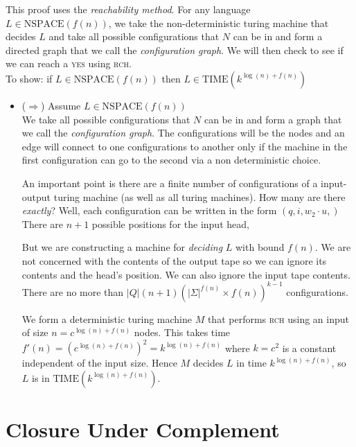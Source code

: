 This proof uses the \textit{reachability method}. For 
any language $L \in \text{NSPACE}(f(n))$, we take the non-deterministic 
turing machine that decides $L$ and take all possible configurations that
$N$ can be in and form a directed graph that we call the \textit{configuration graph}.
We will then check to see if we can reach a \textsc{yes} using \textsc{rch}.\\
To show: if $L \in \text{NSPACE}(f(n))$ then $L \in \text{TIME}(k^{\log(n)+f(n)})$

\begin{itemize}   
\renewcommand{\labelitemi}{$\Box$}
\item ($\Rightarrow$) Assume $L \in \text{NSPACE}(f(n))$ \\
We take all possible configurations that
$N$ can be in and form a graph that we call the \textit{configuration graph}.
The configurations will be the nodes and an edge will connect to 
one configurations to another only if the machine in the first configuration 
can go to the second via a non deterministic choice. 

An important point is there are a finite number of configurations 
of a input-output turing machine (as well as all turing machines). 
How many are there \textit{exactly}? Well, each configuration can 
be written in the form $(q, i, w_2\cdot u, )$
There are $n+1$ possible positions for the input head, 

But we are constructing a machine for \textit{deciding} $L$ with bound $f(n)$. 
We are not concerned with the contents of the output tape so we can ignore its 
contents and the head's position. We can also ignore the input tape contents. 
There are no more than $|Q|(n+1)(|\Sigma|^{f(n)} \times f(n))^{k-1}$ configurations.

We form a deterministic turing machine $M$ that performs \textsc{rch} using 
an input of size $n = c^{\log(n) + f(n)}$ nodes. 
This takes time $f'(n) = (c^{\log(n)+f(n)})^{2} = k^{\log(n)+f(n)}$ 
where $k = c^2$ is a constant independent of the input size. 
Hence $M$ decides $L$ in time $k^{\log(n)+f(n)}$, 
so $L$ is in $\text{TIME}(k^{\log(n)+f(n)})$.
\end{itemize}



\section{Closure Under Complement}



